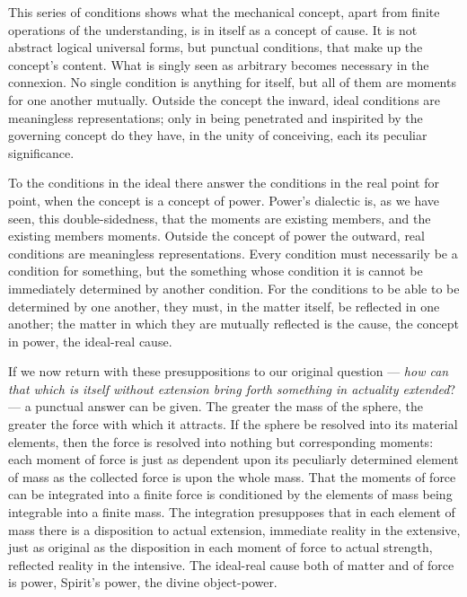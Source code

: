 \documentclass[12pt,a4paper]{book}
\begin{document}
This series of conditions shows what the mechanical concept, apart from finite operations of the
understanding, is in itself as a concept of cause. It is not abstract logical universal forms,
but punctual conditions, that make up the concept's content. What is singly seen as arbitrary
becomes necessary in the connexion. No single condition is anything for itself, but all of them
are moments for one another mutually. Outside the concept the inward, ideal conditions are
meaningless representations; only in being penetrated and inspirited by the governing concept do
they have, in the unity of conceiving, each its peculiar significance.

To the conditions in the ideal there answer the conditions in the real point for point, when the
concept is a concept of power. Power's dialectic is, as we have seen, this double-sidedness,
that the moments are existing members, and the existing members moments. Outside the concept of
power the outward, real conditions are meaningless representations. Every condition must
necessarily be a condition for something, but the something whose condition it is cannot be
immediately determined by another condition. For the conditions to be able to be determined by
one another, they must, in the matter itself,
be reflected in one another; the matter in which they are mutually reflected is the cause, the
concept in power, the ideal-real cause.

If we now return with these presuppositions to our original question --- \emph{how can that
which is itself without extension bring forth something in actuality extended}? --- a punctual
answer can be given. The greater the mass of the sphere, the greater the force with which it
attracts. If the sphere be resolved into its material elements, then the force is resolved into
nothing but corresponding moments: each moment of force is just as dependent upon its
peculiarly determined element of mass as the collected force is upon the whole mass. That the
moments of force can be integrated into a finite force is conditioned by the elements of mass
being integrable into a finite mass. The integration presupposes that in each element of mass
there is a disposition to actual extension, immediate reality in the extensive, just as
original as the disposition in each moment of force to actual strength, reflected reality in
the intensive. The ideal-real cause both of matter and of force is power, Spirit's power, the
divine object-power.
\end{document}
